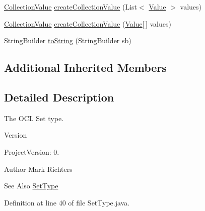 \begin{DoxyCompactItemize}
\item 
\hyperlink{classorg_1_1tzi_1_1use_1_1uml_1_1ocl_1_1value_1_1_collection_value}{Collection\-Value} \hyperlink{classorg_1_1tzi_1_1use_1_1uml_1_1ocl_1_1type_1_1_set_type_aecbac43df1beaae5a69ccfefaebb3ec9}{create\-Collection\-Value} (List$<$ \hyperlink{classorg_1_1tzi_1_1use_1_1uml_1_1ocl_1_1value_1_1_value}{Value} $>$ values)
\item 
\hyperlink{classorg_1_1tzi_1_1use_1_1uml_1_1ocl_1_1value_1_1_collection_value}{Collection\-Value} \hyperlink{classorg_1_1tzi_1_1use_1_1uml_1_1ocl_1_1type_1_1_set_type_af5c514798f39c40b12ad81d24b569756}{create\-Collection\-Value} (\hyperlink{classorg_1_1tzi_1_1use_1_1uml_1_1ocl_1_1value_1_1_value}{Value}\mbox{[}$\,$\mbox{]} values)
\item 
String\-Builder \hyperlink{classorg_1_1tzi_1_1use_1_1uml_1_1ocl_1_1type_1_1_set_type_aaf5068984ee0a452fc86b8b5a66308e8}{to\-String} (String\-Builder sb)
\end{DoxyCompactItemize}
\subsection*{Additional Inherited Members}


\subsection{Detailed Description}
The O\-C\-L Set type.

\begin{DoxyVersion}{Version}

\end{DoxyVersion}
\begin{DoxyParagraph}{Project\-Version\-:}
0. 
\end{DoxyParagraph}
\begin{DoxyAuthor}{Author}
Mark Richters 
\end{DoxyAuthor}
\begin{DoxySeeAlso}{See Also}
\hyperlink{classorg_1_1tzi_1_1use_1_1uml_1_1ocl_1_1type_1_1_set_type}{Set\-Type} 
\end{DoxySeeAlso}


Definition at line 40 of file Set\-Type.\-java.



